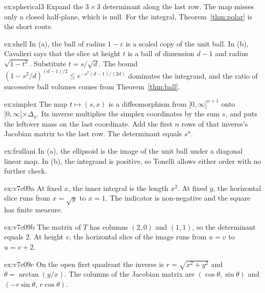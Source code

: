 \begin{hint}{ex:spherical3}
Expand the $3\times 3$ determinant along the last row. The map misses only a closed half-plane, which is null. For the integral, Theorem~\ref{thm:polar} is the short route.
\end{hint}

\begin{hint}{ex:shell}
In (a), the ball of radius $1-\varepsilon$ is a scaled copy of the unit ball. In (b), Cavalieri says that the slice at height $t$ is a ball of dimension $d-1$ and radius $\sqrt{1-t^2}$. Substitute $t=s/\sqrt d$. The bound $(1-s^2/d)^{(d-1)/2}\le e^{-s^2(d-1)/(2d)}$ dominates the integrand, and the ratio of successive ball volumes comes from Theorem~\ref{thm:ball}.
\end{hint}

\begin{hint}{ex:simplex}
The map $t\mapsto(s,x)$ is a diffeomorphism from $]0,\infty[^{n+1}$ onto $]0,\infty[\times\Delta_n$. Its inverse multiplies the simplex coordinates by the sum $s$, and puts the leftover mass on the last coordinate. Add the first $n$ rows of that inverse's Jacobian matrix to the last row. The determinant equals $s^n$.
\end{hint}

\begin{hint}{ex:frullani}
In (a), the ellipsoid is the image of the unit ball under a diagonal linear map. In (b), the integrand is positive, so Tonelli allows either order with no further check.
\end{hint}

\begin{hint}{ex:v7c09a}
At fixed $x$, the inner integral is the length $x^2$. At fixed $y$, the horizontal slice runs from $x=\sqrt y$ to $x=1$. The indicator is non-negative and the square has finite measure.
\end{hint}

\begin{hint}{ex:v7c09b}
The matrix of $T$ has columns $(2,0)$ and $(1,1)$, so the determinant equals $2$. At height $v$, the horizontal slice of the image runs from $u=v$ to $u=v+2$.
\end{hint}

\begin{hint}{ex:v7c09c}
On the open first quadrant the inverse is $r=\sqrt{x^2+y^2}$ and $\theta=\arctan(y/x)$. The columns of the Jacobian matrix are $(\cos\theta,\sin\theta)$ and $(-r\sin\theta,\,r\cos\theta)$.
\end{hint}

